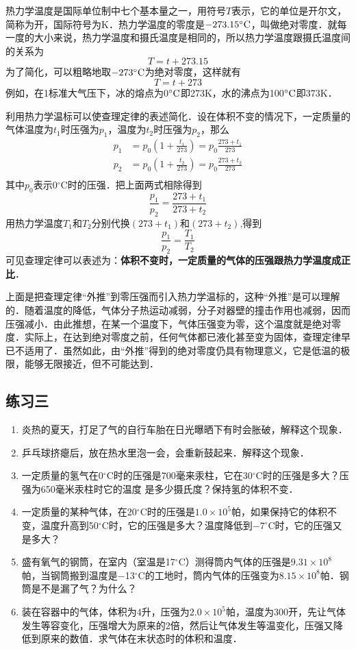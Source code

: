 热力学温度是国际单位制中七个基本量之一，用符号$T$表示，它的单位是开尔文，简称为开，国际符号为K．热力学温度的零度是$-273.15^\circ{\rm C}$，叫做绝对零度．就每一度的大小来说，热力学温度和摄氏温度是相同的，所以热力学温度跟摄氏温度间的关系为
\[T=t+273.15 \]
为了简化，可以粗略地取$-273^\circ{\rm C}$为绝对零度，这样就有
\[T=t+273 \]
例如，在1标准大气压下，冰的熔点为0$^\circ{\rm C}$即273K，水的沸点为100$^\circ{\rm C}$即373K．

利用热力学温标可以使查理定律的表述简化．设在体积不变的情况下，一定质量的气体温度为$t_1$时压强为$p_1$，温度为$t_2$时压强为$p_2$，那么
\[\begin{split}
p_1&=p_0\left(1+\frac{t_1}{273}\right)=p_0\frac{273+t_1}{273}\\
p_2&=p_0\left(1+\frac{t_2}{273}\right)=p_0\frac{273+t_2}{273}\\
\end{split} \]
其中$p_0$表示0$^\circ$C时的压强．把上面两式相除得到
\[\frac{p_1}{p_2}=\frac{273+t_1}{273+t_2} \]
用热力学温度$T_1$和$T_2$分别代换$(273+t_1)$和$(273+t_2)$,得到
\[\frac{p_1}{p_2}=\frac{T_1}{T_2} \]
可见查理定律可以表述为：\textbf{体积不变时，一定质量的气体的压强跟热力学温度成正比}．

上面是把查理定律“外推”到零压强而引入热力学温标的，这种“外推”是可以理解的．随着温度的降低，气体分子热运动减弱，分子对器壁的撞击作用也减弱，因而压强减小．由此推想，在某一个温度下，气体压强变为零，这个温度就是绝对零度．实际上，在达到绝对零度之前，任何气体都已液化甚至变为固体，查理定律早已不适用了．虽然如此，由“外推”得到的绝对零度仍具有物理意义，它是低温的极限，能够无限接近，但不可能达到．

\subsection*{练习三}

\begin{enumerate}
    \item 炎热的夏天，打足了气的自行车胎在日光曝晒下有时会胀破，解释这个现象．
\item 乒乓球挤瘪后，放在热水里泡一会，会重新鼓起来．解释这个现象．
\item 一定质量的氢气在0$^\circ$C时的压强是700毫来汞柱，它在30$^\circ$C时的压强是多大？压强为650毫米汞柱时它的温度
是多少摄氏度？保持氢的体积不变．
\item 一定质量的某种气体，在20$^\circ$C时的压强是$1.0\times 10^5$帕，如果保持它的体积不变，温度升高到50$^\circ$C时，它的压强是多大？温度降低到$-7^\circ$C时，它的压强又是多大？
\item 盛有氧气的钢筒，在室内（室温是17$^\circ$C）测得筒内气体的压强是$9.31\times 10^8$帕，当钢筒搬到温度是$-$13$^\circ$C的工地时，筒内气体的压强变为$8.15\times 10^8$帕．钢筒是不是漏了气？为什么？
\item 装在容器中的气体，体积为4升，压强为$2.0\times 10^5$帕，温度为300开，先让气体发生等容变化，压强增大为原来的2倍，然后让气体发生等温变化，压强又降低到原来的数值．求气体在末状态时的体积和温度．

\end{enumerate}

